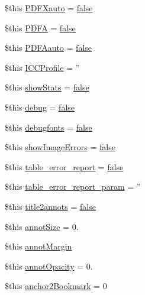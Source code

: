 \begin{DoxyCompactItemize}
\item 
\$this \hyperlink{config_8php_a914b8ce8d1d0ca875423412ba468b1d2}{P\-D\-F\-Xauto} = \hyperlink{ttfontsuni_8php_afbaa04e5cc97693dc668b3c45d3dd740}{false}
\item 
\$this \hyperlink{config_8php_a73c58821a56f993b6e96eeafa3a1f009}{P\-D\-F\-A} = \hyperlink{ttfontsuni_8php_afbaa04e5cc97693dc668b3c45d3dd740}{false}
\item 
\$this \hyperlink{config_8php_ae21fb063d11f26e6f6f2640316b98840}{P\-D\-F\-Aauto} = \hyperlink{ttfontsuni_8php_afbaa04e5cc97693dc668b3c45d3dd740}{false}
\item 
\$this \hyperlink{config_8php_af22f04b7300121fcbf6a8b3f52c759fb}{I\-C\-C\-Profile} = ''
\item 
\$this \hyperlink{config_8php_ace8e8cc1120e006bd2107db6d57dc460}{show\-Stats} = \hyperlink{ttfontsuni_8php_afbaa04e5cc97693dc668b3c45d3dd740}{false}
\item 
\$this \hyperlink{config_8php_a350aa2f39cda347f49239e15d2365189}{debug} = \hyperlink{ttfontsuni_8php_afbaa04e5cc97693dc668b3c45d3dd740}{false}
\item 
\$this \hyperlink{config_8php_a1e90fccb91d24503ef79c7d6e1b6ab43}{debugfonts} = \hyperlink{ttfontsuni_8php_afbaa04e5cc97693dc668b3c45d3dd740}{false}
\item 
\$this \hyperlink{config_8php_ab00a828b784d970d099dc46421761d7d}{show\-Image\-Errors} = \hyperlink{ttfontsuni_8php_afbaa04e5cc97693dc668b3c45d3dd740}{false}
\item 
\$this \hyperlink{config_8php_a51cbc0936934d03ee2b092267f070d41}{table\-\_\-error\-\_\-report} = \hyperlink{ttfontsuni_8php_afbaa04e5cc97693dc668b3c45d3dd740}{false}
\item 
\$this \hyperlink{config_8php_af297f55f803a30da5f7e85adbe55a7fa}{table\-\_\-error\-\_\-report\-\_\-param} = ''
\item 
\$this \hyperlink{config_8php_a4507dbbf43b6207f3c3030867c5dcb59}{title2annots} = \hyperlink{ttfontsuni_8php_afbaa04e5cc97693dc668b3c45d3dd740}{false}
\item 
\$this \hyperlink{config_8php_aec87d4b571fd919d5940c9dd44756157}{annot\-Size} = 0.
\item 
\$this \hyperlink{config_8php_ad2857b9ce8d1f02a000da38c1ac8fc8c}{annot\-Margin}
\item 
\$this \hyperlink{config_8php_a388cb87bb22aff4bd572cb98d06f8ed8}{annot\-Opacity} = 0.
\item 
\$this \hyperlink{config_8php_a8ac4678cf6d870bd789cf4ea72236a70}{anchor2\-Bookmark} = 0

\end{DoxyCompactItemize}
